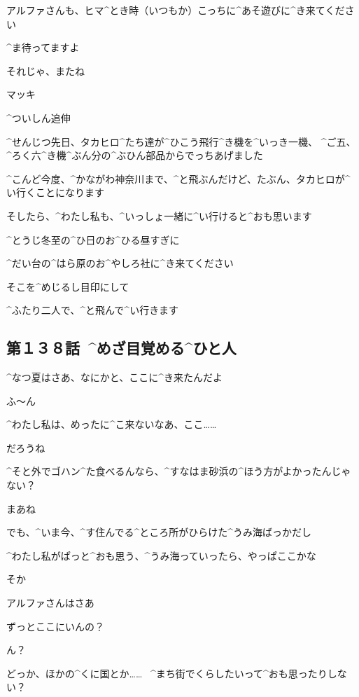 \Makki アルファさんも、ヒマ^{とき}{時}（いつもか）こっちに^{あそ}{遊}びに^{き}{来}てください

\Makki ^{ま}{待}ってますよ

\page[99]
\Makki それじゃ、またね

\Makki マッキ

\page[100]
\Makki ^{ついしん}{追伸}

\Makki ^{せんじつ}{先日}、タカヒロ^{たち}{達}が^{ひこう}{飛行}^{き}{機}を^{いっき}{一機}、
^{ご}{五}、^{ろく}{六}^{き}{機}^{ぶん}{分}の^{ぶひん}{部品}からでっちあげました

\Makki ^{こんど}{今度}、^{かながわ}{神奈川}まで、^{と}{飛}ぶんだけど、たぶん、タカヒロが^{い}{行}くことになります

\page[101]
\Makki そしたら、^{わたし}{私}も、^{いっしょ}{一緒}に^{い}{行}けると^{おも}{思}います

\Makki ^{とうじ}{冬至}の^{ひ}{日}のお^{ひる}{昼}すぎに

\Makki ^{だい}{台}の^{はら}{原}のお^{やしろ}{社}に^{き}{来}てください

\Makki そこを^{めじるし}{目印}にして

\page[102]
\Makki ^{ふたり}{二人}で、^{と}{飛}んで^{い}{行}きます


\subsection{第１３８話\ ^{めざ}{目覚}める^{ひと}{人}}

\page[108]
\Makki ^{なつ}{夏}はさあ、なにかと、ここに^{き}{来}たんだよ

\Alpha ふ〜ん

\page[109]
\Alpha ^{わたし}{私}は、めったに^{こ}{来}ないなあ、ここ……

\Makki だろうね

\Alpha ^{そと}{外}でゴハン^{た}{食}べるんなら、^{すなはま}{砂浜}の^{ほう}{方}がよかったんじゃない？

\Makki まあね

\Makki でも、^{いま}{今}、^{す}{住}んでる^{ところ}{所}がひらけた^{うみ}{海}ばっかだし

\Makki ^{わたし}{私}がぱっと^{おも}{思}う、^{うみ}{海}っていったら、やっぱここかな

\Alpha そか

\page[110]
\Makki アルファさんはさあ

\Makki ずっとここにいんの？

\Alpha ん？

\Makki どっか、ほかの^{くに}{国}とか……
\ ^{まち}{街}でくらしたいって^{おも}{思}ったりしない？

